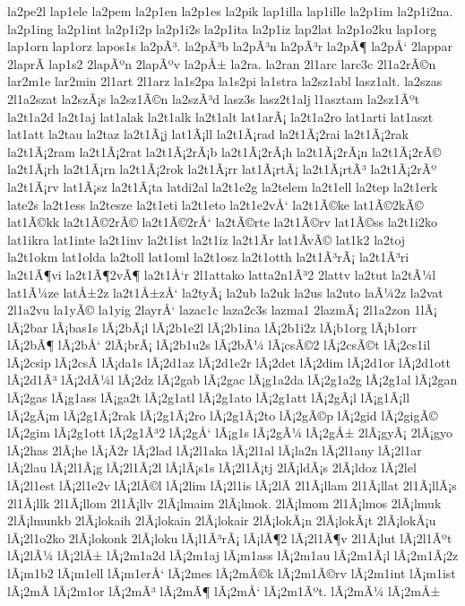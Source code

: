 {la2pe2l
lap1ele
la2pem
la2p1en
la2p1es
la2pik
lap1illa
lap1ille
la2p1im
la2p1i2na.
la2p1ing
la2p1int
la2p1i2p
la2p1i2s
la2p1ita
la2p1iz
lap2lat
la2p1o2ku
lap1org
lap1orn
lap1orz
lapos1s
la2pÃ³.
la2pÃ³b
la2pÃ³n
la2pÃ³r
la2pÃ¶
la2pÅ‘
2lappar
2laprÃ­
lap1s2
2lapÃºn
2lapÃºv
la2pÅ±
la2ra.
la2ran
2l1arc
larc3c
2l1a2rÃ©n
lar2m1e
lar2min
2l1art
2l1arz
la1s2pa
la1s2pi
la1stra
la2sz1abl
lasz1alt.
la2szas
2l1a2szat
la2szÃ¡s
la2sz1Ã©n
la2szÃ³d
lasz3s
lasz2t1alj
l1asztam
la2sz1Ãºt
la2t1a2d
la2t1aj
lat1alak
la2t1alk
la2t1alt
lat1arÃ¡
la2t1a2ro
lat1arti
lat1aszt
lat1att
la2tau
la2taz
la2t1Ã¡j
lat1Ã¡ll
la2t1Ã¡rad
la2t1Ã¡2rai
la2t1Ã¡2rak
la2t1Ã¡2ram
la2t1Ã¡2rat
la2t1Ã¡2rÃ¡b
la2t1Ã¡2rÃ¡h
la2t1Ã¡2rÃ¡n
la2t1Ã¡2rÃ©
la2t1Ã¡rh
la2t1Ã¡rn
la2t1Ã¡2rok
la2t1Ã¡rr
lat1Ã¡rtÃ¡
la2t1Ã¡rtÃ³
la2t1Ã¡2rÃº
la2t1Ã¡rv
lat1Ã¡sz
la2t1Ã¡ta
latdi2al
la2t1e2g
la2telem
la2t1ell
la2tep
la2t1erk
late2s
la2t1ess
la2tesze
la2t1eti
la2t1eto
la2t1e2vÅ‘
la2t1Ã©ke
lat1Ã©2kÃ©
lat1Ã©kk
la2t1Ã©2rÃ©
la2t1Ã©2rÅ‘
la2tÃ©rte
la2t1Ã©rv
lat1Ã©ss
la2t1i2ko
lat1ikra
lat1inte
la2t1inv
la2t1ist
la2t1iz
la2t1Ã­r
lat1Ã­vÃ©
lat1k2
la2toj
la2t1okm
lat1olda
la2toll
lat1oml
la2t1osz
la2t1otth
la2t1Ã³rÃ¡
la2t1Ã³ri
la2t1Ã¶vi
la2t1Ã¶2vÃ¶
la2t1Å‘r
2l1attako
latta2n1Ã³2
2lattv
la2tut
la2tÃ¼l
lat1Ã¼ze
latÅ±2z
la2t1Å±zÅ‘
la2tyÃ¡
la2ub
la2uk
la2us
la2uto
laÃ¼2z
la2vat
2l1a2vu
la1yÃ©
la1yig
2layrÅ‘
lazac1c
laza2c3s
lazma1
2lazmÃ¡
2l1a2zon
1lÃ¡
lÃ¡2bar
lÃ¡bas1s
lÃ¡2bÃ¡l
lÃ¡2b1e2l
lÃ¡2b1ina
lÃ¡2b1i2z
lÃ¡b1org
lÃ¡b1orr
lÃ¡2bÃ¶
lÃ¡2bÅ‘
2lÃ¡brÃ¡
lÃ¡2b1u2s
lÃ¡2bÃ¼
lÃ¡csÃ©2
lÃ¡2csÃ©t
lÃ¡2cs1il
lÃ¡2csip
lÃ¡2csÃ­
lÃ¡da1s
lÃ¡2d1az
lÃ¡2d1e2r
lÃ¡2det
lÃ¡2dim
lÃ¡2d1or
lÃ¡2d1ott
lÃ¡2d1Ã³
lÃ¡2dÃ¼l
lÃ¡2dz
lÃ¡2gab
lÃ¡2gac
lÃ¡g1a2da
lÃ¡2g1a2g
lÃ¡2g1al
lÃ¡2gan
lÃ¡2gas
lÃ¡g1ass
lÃ¡ga2t
lÃ¡2g1atl
lÃ¡2g1ato
lÃ¡2g1att
lÃ¡2gÃ¡l
lÃ¡g1Ã¡ll
lÃ¡2gÃ¡m
lÃ¡2g1Ã¡2rak
lÃ¡2g1Ã¡2ro
lÃ¡2g1Ã¡2to
lÃ¡2gÃ©p
lÃ¡2gid
lÃ¡2gigÃ©
lÃ¡2gim
lÃ¡2g1ott
lÃ¡2g1Ã³2
lÃ¡2gÅ‘
lÃ¡g1s
lÃ¡2gÃ¼
lÃ¡2gÅ±
2lÃ¡gyÃ¡
2lÃ¡gyo
lÃ¡2has
2lÃ¡he
lÃ¡Ã­2r
lÃ¡2lad
lÃ¡2l1aka
lÃ¡2l1al
lÃ¡la2n
lÃ¡2l1any
lÃ¡2l1ar
lÃ¡2lau
lÃ¡2l1Ã¡g
lÃ¡2l1Ã¡2l
lÃ¡lÃ¡s1s
lÃ¡2l1Ã¡tj
2lÃ¡ldÃ¡s
2lÃ¡ldoz
lÃ¡2lel
lÃ¡2l1est
lÃ¡2l1e2v
lÃ¡2lÃ©l
lÃ¡2lim
lÃ¡2l1is
lÃ¡2lÃ­
2l1Ã¡llam
2l1Ã¡llat
2l1Ã¡llÃ¡s
2l1Ã¡llk
2l1Ã¡llom
2l1Ã¡llv
2lÃ¡lmaim
2lÃ¡lmok.
2lÃ¡lmom
2l1Ã¡lmos
2lÃ¡lmuk
2lÃ¡lmunkb
2lÃ¡lokaih
2lÃ¡lokain
2lÃ¡lokair
2lÃ¡lokÃ¡n
2lÃ¡lokÃ¡t
2lÃ¡lokÃ¡u
lÃ¡2l1o2ko
2lÃ¡lokonk
2lÃ¡loku
lÃ¡l1Ã³rÃ¡
lÃ¡lÃ¶2
lÃ¡2l1Ã¶v
2l1Ã¡lut
lÃ¡2l1Ãºt
lÃ¡2lÃ¼
lÃ¡2lÅ±
lÃ¡2m1a2d
lÃ¡2m1aj
lÃ¡m1ass
lÃ¡2m1au
lÃ¡2m1Ã¡l
lÃ¡2m1Ã¡2z
lÃ¡m1b2
lÃ¡m1ell
lÃ¡m1erÅ‘
lÃ¡2mes
lÃ¡2mÃ©k
lÃ¡2m1Ã©rv
lÃ¡2m1int
lÃ¡m1ist
lÃ¡2mÃ­
lÃ¡2m1or
lÃ¡2mÃ³
lÃ¡2mÃ¶
lÃ¡2mÅ‘
lÃ¡2m1Ãºt.
lÃ¡2mÃ¼
lÃ¡2mÅ±
}
